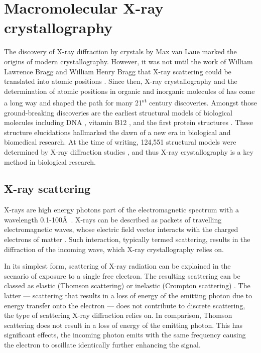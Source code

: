 \section{Macromolecular X-ray crystallography}
The discovery of X-ray diffraction by crystals by Max van Laue \cite{Friedrich1913-vx,Laue1913-sn} marked the origins of modern crystallography. However, it was not until the work of William Lawrence Bragg and William Henry Bragg that X-ray scattering could be translated into atomic positions \cite{Bragg1913-cx,Bragg1929-xp,Bragg1912-ht}. Since then, X-ray crystallography and the determination of atomic positions in organic and inorganic molecules of has come a long way and shaped the path for many 21\textsuperscript{st} century discoveries. Amongst those ground-breaking discoveries are the earliest structural models of biological molecules including DNA \cite{Watson1953-qw}, vitamin B12 \cite{Hodgkin1956-mx}, and the first protein structures \cite{Blundell1971-mv,Blake1965-ng,Perutz1960-qz,Kendrew1958-on}. These structure elucidations hallmarked the dawn of a new era in biological and biomedical research. At the time of writing, 124,551 structural models were determined by X-ray diffraction studies \cite{Berman2000-ua}, and thus X-ray crystallography is a key method in biological research.

\subsection{X-ray scattering}
X-rays are high energy photons part of the electromagnetic spectrum with a wavelength 0.1-100\AA\ \cite{Rupp2010-nc}. X-rays can be described as packets of travelling electromagnetic waves, whose electric field vector interacts with the charged electrons of matter \cite{Rupp2010-nc}. Such interaction, typically termed scattering, results in the diffraction of the incoming wave, which X-ray crystallography relies on.

In its simplest form, scattering of X-ray radiation can be explained in the scenario of exposure to a single free electron. The resulting scattering can be classed as elastic (Thomson scattering) or inelastic (Crompton scattering) \cite{Rupp2010-nc}. The latter --- scattering that results in a loss of energy of the emitting photon due to energy transfer onto the electron --- does not contribute to discrete scattering, the type of scattering X-ray diffraction relies on. In comparison, Thomson scattering does not result in a loss of energy of the emitting photon. This has significant effects, the incoming photon emits with the same frequency causing the electron to oscillate identically further enhancing the signal.


